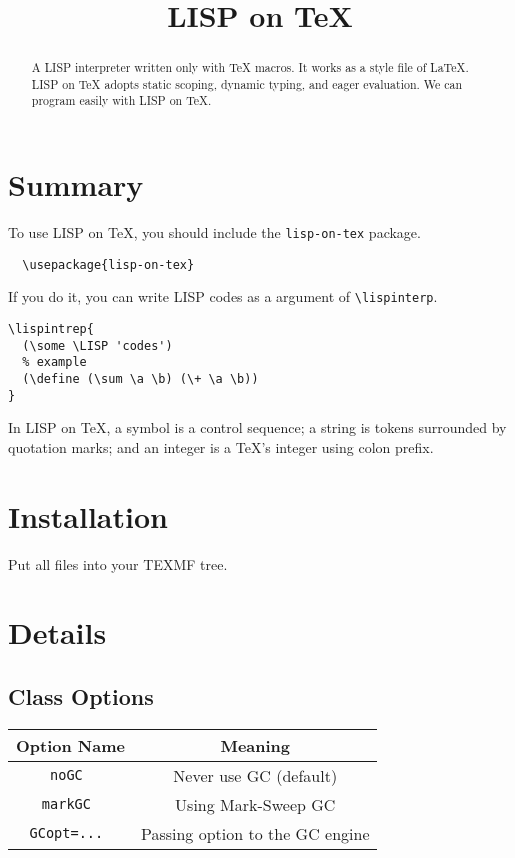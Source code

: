 \documentclass[10pt,a4paper]{article}
\title{LISP on TeX}
\begin{document}
\maketitle
\begin{abstract}
A LISP interpreter written only with TeX macros.
It works as a style file of LaTeX.
LISP on TeX adopts static scoping, dynamic typing, and eager evaluation.
We can program easily with LISP on TeX.
\end{abstract}

\tableofcontents

\section{Summary}
To use LISP on TeX, you should include the \verb|lisp-on-tex| package.
\color{blue}
\begin{verbatim}
  \usepackage{lisp-on-tex}
\end{verbatim}
\color{black}

If you do it, you can write LISP codes as a argument of \verb|\lispinterp|.

\color{teal}
\begin{verbatim}
\lispintrep{
  (\some \LISP 'codes')
  % example
  (\define (\sum \a \b) (\+ \a \b))
}
\end{verbatim}
\color{black}

In LISP on TeX, a symbol is a control sequence;
a string is tokens surrounded by quotation marks;
and an integer is a TeX's integer using colon prefix.

\section{Installation}

Put all files into your TEXMF tree.

\section{Details} 

\subsection{Class Options}

\begin{tabular}{|c|c|}
\hline 
Option Name & Meaning \\ 
\hline\hline 
\tt{noGC} & Never use GC (default) \\ 
\hline 
\tt{markGC} & Using Mark-Sweep GC \\ 
\hline 
\tt{GCopt=...} & Passing option to the GC engine \\ 
\hline 
\end{tabular} \\ \\
\end{document}
